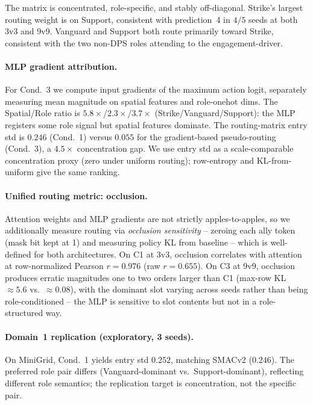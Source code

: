 \documentclass{nextgame2026}
\begin{document}
The matrix is concentrated, role-specific, and stably off-diagonal. Strike's largest routing weight is on Support, consistent with prediction~4 in $4/5$ seeds at both 3v3 and 9v9. Vanguard and Support both route primarily toward Strike, consistent with the two non-DPS roles attending to the engagement-driver.

\paragraph{MLP gradient attribution.} For Cond.~3 we compute input gradients of the maximum action logit, separately measuring mean magnitude on spatial features and role-onehot dims. The Spatial/Role ratio is $5.8\times$/$2.3\times$/$3.7\times$ (Strike/Vanguard/Support): the MLP registers some role signal but spatial features dominate. The routing-matrix entry std is $0.246$ (Cond.~1) versus $0.055$ for the gradient-based pseudo-routing (Cond.~3), a $4.5\times$ concentration gap. We use entry std as a scale-comparable concentration proxy (zero under uniform routing); row-entropy and KL-from-uniform give the same ranking.

\paragraph{Unified routing metric: occlusion.} Attention weights and MLP gradients are not strictly apples-to-apples, so we additionally measure routing via \emph{occlusion sensitivity} -- zeroing each ally token (mask bit kept at 1) and measuring policy KL from baseline -- which is well-defined for both architectures. On C1 at 3v3, occlusion correlates with attention at row-normalized Pearson $r{=}0.976$ (raw $r{=}0.655$). On C3 at 9v9, occlusion produces erratic magnitudes one to two orders larger than C1 (max-row KL $\approx 5.6$ vs.\ $\approx 0.08$), with the dominant slot varying across seeds rather than being role-conditioned -- the MLP is sensitive to slot contents but not in a role-structured way.

\paragraph{Domain~1 replication (exploratory, 3 seeds).} On MiniGrid, Cond.~1 yields entry std $0.252$, matching SMACv2 ($0.246$). The preferred role pair differs (Vanguard-dominant vs.\ Support-dominant), reflecting different role semantics; the replication target is concentration, not the specific pair.
\end{document}
